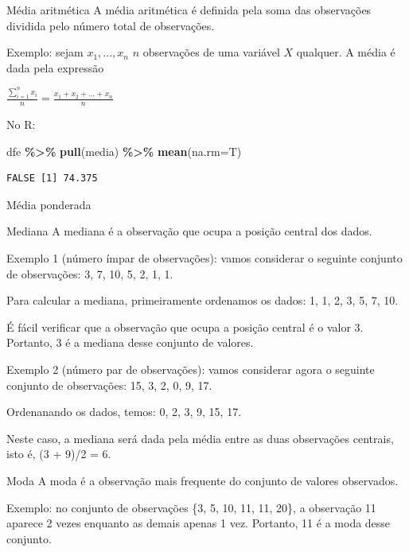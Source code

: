 \documentclass[
  9pt,
  ignorenonframetext,
  aspectratio=169]{beamer}
\newenvironment{Shaded}{\begin{snugshade}}{\end{snugshade}}
\newcommand{\DataTypeTok}[1]{\textcolor[rgb]{0.13,0.29,0.53}{#1}}
\newcommand{\KeywordTok}[1]{\textcolor[rgb]{0.13,0.29,0.53}{\textbf{#1}}}
\newcommand{\NormalTok}[1]{#1}
\newcommand{\OperatorTok}[1]{\textcolor[rgb]{0.81,0.36,0.00}{\textbf{#1}}}
\newcommand{\StringTok}[1]{\textcolor[rgb]{0.31,0.60,0.02}{#1}}
\begin{document}
\begin{frame}[fragile]{Média aritmética}
\protect\hypertarget{muxe9dia-aritmuxe9tica}{}
A média aritmética é definida pela soma das observações dividida pelo
número total de observações.

Exemplo: sejam \(x_1, ..., x_n\) \(n\) observações de uma variável \(X\)
qualquer. A média é dada pela expressão

\(\frac{\sum_{i=1}^{n}x_i}{n} = \frac{x_1 + x_2 + ... + x_n}{n}\)

No R:

\begin{Shaded}
\begin{Highlighting}[]
\NormalTok{dfe }\OperatorTok{\%\textgreater{}\%}
\StringTok{  }\KeywordTok{pull}\NormalTok{(media) }\OperatorTok{\%\textgreater{}\%}
\StringTok{  }\KeywordTok{mean}\NormalTok{(}\DataTypeTok{na.rm=}\NormalTok{T)}
\end{Highlighting}
\end{Shaded}

\begin{verbatim}
FALSE [1] 74.375
\end{verbatim}
\end{frame}

\begin{frame}{Média ponderada}
\protect\hypertarget{muxe9dia-ponderada}{}
\end{frame}

\begin{frame}{Mediana}
\protect\hypertarget{mediana}{}
A mediana é a observação que ocupa a posição central dos dados.

Exemplo 1 (número ímpar de observações): vamos considerar o seguinte
conjunto de observações: 3, 7, 10, 5, 2, 1, 1.

Para calcular a mediana, primeiramente ordenamos os dados: 1, 1, 2, 3,
5, 7, 10.

É fácil verificar que a observação que ocupa a posição central é o valor
3. Portanto, 3 é a mediana desse conjunto de valores.

Exemplo 2 (número par de observações): vamos considerar agora o seguinte
conjunto de observações: 15, 3, 2, 0, 9, 17.

Ordenanando os dados, temos: 0, 2, 3, 9, 15, 17.

Neste caso, a mediana será dada pela média entre as duas observações
centrais, isto é, (3 + 9)/2 = 6.
\end{frame}

\begin{frame}{Moda}
\protect\hypertarget{moda}{}
A moda é a observação mais frequente do conjunto de valores observados.

Exemplo: no conjunto de observações \{3, 5, 10, 11, 11, 20\}, a
observação 11 aparece 2 vezes enquanto as demais apenas 1 vez. Portanto,
11 é a moda desse conjunto.
\end{frame}
\end{document}
